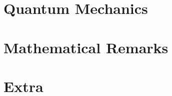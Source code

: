 % 
% 
% 
% 



\chapter{Quantum Mechanics}




\chapter{Mathematical Remarks}



\chapter{Extra}








\renewcommand{\emph}[1]{\textit{#1}}
\printbibliography


